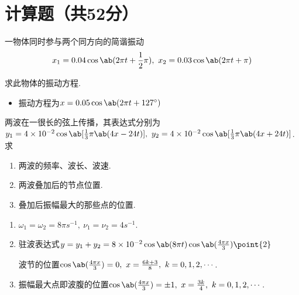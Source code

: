 \section{计算题（共52分）}
\begin{problem}[简谐振动的合成][5]
    一物体同时参与两个同方向的简谐振动
    \[x_1=0.04\cos{\ab(2\pi t+\frac{1}{2}\pi)},\ x_2=0.03\cos{\ab(2\pi t+\pi)}\]

    求此物体的振动方程.
\end{problem}
\begin{solution}
\begin{itemize}
\item 振动方程为$x=0.05\cos{\ab(2\pi t+127^{\circ})}$
\end{itemize}
\end{solution}

\begin{problem}[驻波][8]
两波在一很长的弦上传播，其表达式分别为$y_1=4\times 10^{-2}\cos{\ab[\frac{1}{3}\pi\ab(4x-24t)]},\ y_2=4\times 10^{-2}\cos{\ab[\frac{1}{3}\pi\ab(4x+24t)]}$. 求
    \begin{enumerate}
        \item 两波的频率、波长、波速.
        \item 两波叠加后的节点位置.
        \item 叠加后振幅最大的那些点的位置.
    \end{enumerate}
\end{problem}
\begin{solution}
\begin{enumerate}
    \item $\omega_1=\omega_2=8\pi\unit{s^{-1}},\ \nu_1=\nu_2=4\unit{s^{-1}}$.
    \item 驻波表达式$y=y_1+y_2=8\times 10^{-2}\cos{\ab(8\pi t)}\cos{\ab(\frac{4\pi x}{3})}\point{2}$

    波节的位置$\cos{\ab(\frac{4\pi x}{3})}=0,\ x=\frac{6k+3}{8},\ k=0,1,2,\cdots$.

    \item 振幅最大点即波腹的位置$\cos{\ab(\frac{4\pi x}{3})}=\pm 1,\ x=\frac{3k}{4},\ k=0,1,2,\cdots$. 
\end{enumerate}
\end{solution}

